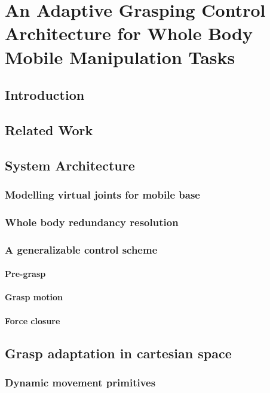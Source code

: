 \chapter{An Adaptive Grasping Control Architecture for Whole Body Mobile Manipulation Tasks}

\section{Introduction}

\section{Related Work}

\section{System Architecture}

\subsection{Modelling virtual joints for mobile base}

\subsection{Whole body redundancy resolution}

\subsection{A generalizable control scheme}

\subsubsection{Pre-grasp} 

\subsubsection{Grasp motion}

\subsubsection{Force closure}

\section{Grasp adaptation in cartesian space}

\subsection{Dynamic movement primitives}


